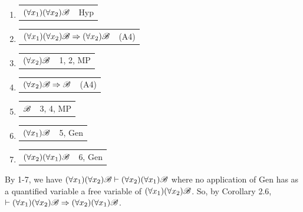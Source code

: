 \begin{enumerate}
    \item 
        \begin{tabular}{p{8cm} r}
            $(\forall x_1)(\forall x_2) \mathscr{B}$ & Hyp
        \end{tabular}
    \item 
        \begin{tabular}{p{8cm} r}
            $(\forall x_1)(\forall x_2) \mathscr{B} \Rightarrow (\forall x_2) \mathscr{B}$ & (A4)
        \end{tabular}
    \item 
        \begin{tabular}{p{8cm} r}
            $(\forall x_2) \mathscr{B}$ & 1, 2, MP
        \end{tabular}
    \item 
        \begin{tabular}{p{8cm} r}
            $(\forall x_2) \mathscr{B} \Rightarrow \mathscr{B}$ & (A4)
        \end{tabular}
    \item 
        \begin{tabular}{p{8cm} r}
            $\mathscr{B}$ & 3, 4, MP
        \end{tabular}
    \item 
        \begin{tabular}{p{8cm} r}
            $(\forall x_1) \mathscr{B}$ & 5, Gen
        \end{tabular}
    \item 
        \begin{tabular}{p{8cm} r}
            $(\forall x_2)(\forall x_1) \mathscr{B}$ & 6, Gen
        \end{tabular}
\end{enumerate}

By 1-7, we have $(\forall x_1)(\forall x_2) \mathscr{B} \vdash (\forall x_2)(\forall x_1) \mathscr{B}$ where no application of Gen has as a quantified variable a free variable of $(\forall x_1)(\forall x_2) \mathscr{B}$. So, by Corollary 2.6, $\vdash (\forall x_1)(\forall x_2) \mathscr{B} \Rightarrow (\forall x_2)(\forall x_1) \mathscr{B}$.
